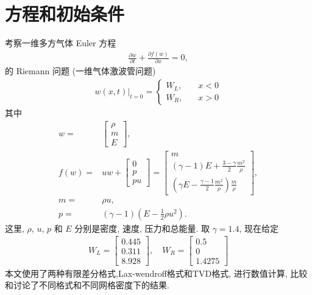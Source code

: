 \documentclass[10.5pt
]{article}
\begin{document}
\section{方程和初始条件}
考察一维多方气体 Euler 方程\citep{Jeffrey1964}
\begin{align}
\frac{\partial w}{\partial t} + \frac{\partial f(w)}{\partial
x}= 0,\label{Eqn:Euler}
\end{align}
的 Riemann 问题 (一维气体激波管问题)
\begin{align}
w(x,t)|_{t=0} = \left\{ \begin{array}{ll}
W_L, & \quad x < 0 \\
W_R, & \quad x > 0
\end{array} \right.
\end{align}
其中
\begin{align}
w =& \left[\begin{array}{c}
\rho\\
m\\
E
\end{array}\right],
\\
f(w) =& u w + \left[\begin{array}{c}
0\\
p\\
p u
\end{array}\right] = \left[\begin{array}{c}
m
\\
(\gamma - 1) E + \frac{3 - \gamma}{2} \frac{m^2}{\rho}
\\
(\gamma E - \frac{\gamma - 1}{2} \frac{m^2}{\rho}) \frac{m}{\rho}
\end{array}\right],
\\
m =& \rho u,
\\
p =& (\gamma - 1)(E - \frac{1}{2} \rho u^2).
\end{align}
这里, $\rho$, $u$, $p$ 和 $E$ 分别是密度, 速度, 压力和总能量. 取 $\gamma=1.4$,
现在给定\citep{Harten1983}
\begin{align}
    W_L = \left[\begin{array}{l}
    0.445\\
    0.311\\
    8.928
    \end{array}\right], \quad W_R = \left[\begin{array}{l}
    0.5\\
    0\\
    1.4275
    \end{array}\right]
\end{align}
本文使用了两种有限差分格式,Lax-wendroff格式和TVD格式, 进行数值计算, 比较和讨论了不同格式和不同网格密度下的结果.
\end{document}
